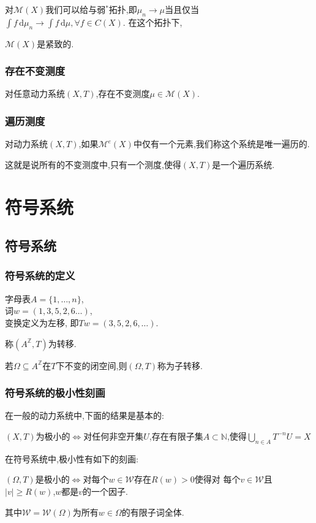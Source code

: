\documentclass[compress,red]{beamer}
\begin{document}
\begin{frame}
对$\mathcal{M}(X)$我们可以给与弱$^*$拓扑,即$\mu_n\rightarrow \mu$当且仅当$\int\!f \, \mathrm{d}\mu_n\rightarrow \int\!f \, \mathrm{d}\mu,\forall f \in C(X)$.
在这个拓扑下,
\begin{theorem}
$\mathcal{M}(X)$是紧致的.
\end{theorem}

\end{frame}

\begin{frame}
\frametitle{存在不变测度}
\begin{theorem}
对任意动力系统$(X,T)$,存在不变测度$\mu\in\mathcal{M}(X)$.
\end{theorem}
\end{frame}

\begin{frame}
\frametitle{遍历测度}
\begin{definition}
对动力系统$(X,T)$,如果$\mathcal{M}^e(X)$中仅有一个元素,我们称这个系统是唯一遍历的.\pause

\medskip
这就是说所有的不变测度中,只有一个测度,使得$(X,T)$是一个遍历系统.
\end{definition}

\end{frame}


\section{符号系统}
\subsection{符号系统}
\begin{frame}
\frametitle{符号系统的定义}
\begin{example}
字母表$A=\{1,\ldots,n\}$,\\ \pause 
词$w=(1,3,5,2,6\ldots)$,\\ \pause
变换定义为左移, \pause 
即$Tw=(3,5,2,6,\ldots)$.
\end{example}
\pause
\begin{definition}
称$(A^{\mathbb{Z}},T)$为转移.\pause

\medskip 
若$\Omega\subseteq A^{\mathbb{Z}}$在$T$下不变的闭空间,则$(\Omega,T)$称为子转移.
\end{definition}
\end{frame}

\begin{frame}
\frametitle{符号系统的极小性刻画}
在一般的动力系统中,下面的结果是基本的:
\begin{theorem}
$(X,T)$为极小的$\Longleftrightarrow$对任何非空开集$U$,存在有限子集$A\subset \mathbb{N}$,使得$\bigcup_{n\in A}T^{-n}U=X$
\end{theorem}
\pause
在符号系统中,极小性有如下的刻画:
\begin{theorem}
$(\Omega,T)$是极小的$\Longleftrightarrow$对每个$w\in \mathcal{W}$存在$R(w)>0$使得对%
每个$v\in \mathcal{W}$且$|v|\geq R(w)$,$w$都是$v$的一个因子.
\end{theorem}
其中$\mathcal{W}=\mathcal{W}(\Omega)$为所有$w\in \Omega$的有限子词全体.
\end{frame}
\end{document}
